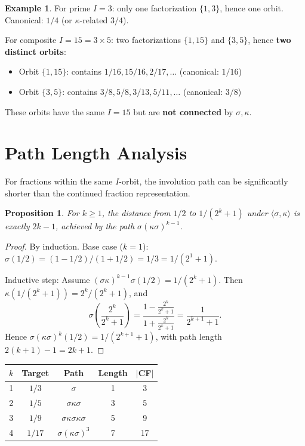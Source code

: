 \documentclass[11pt]{article}
\theoremstyle{plain}
\newtheorem{proposition}[theorem]{Proposition}
\theoremstyle{definition}
\newtheorem{example}[theorem]{Example}
\theoremstyle{remark}
\begin{document}
\begin{example}
For prime $I = 3$: only one factorization $\{1, 3\}$, hence one orbit.
Canonical: $1/4$ (or $\kappa$-related $3/4$).

For composite $I = 15 = 3 \times 5$: two factorizations $\{1, 15\}$ and $\{3, 5\}$,
hence \textbf{two distinct orbits}:
\begin{itemize}
\item Orbit $\{1, 15\}$: contains $1/16, 15/16, 2/17, \ldots$ (canonical: $1/16$)
\item Orbit $\{3, 5\}$: contains $3/8, 5/8, 3/13, 5/11, \ldots$ (canonical: $3/8$)
\end{itemize}
These orbits have the same $I = 15$ but are \textbf{not connected} by $\sigma, \kappa$.
\end{example}

\section{Path Length Analysis}

For fractions within the same $I$-orbit, the involution path can be significantly
shorter than the continued fraction representation.

\begin{proposition}
For $k \geq 1$, the distance from $1/2$ to $1/(2^k+1)$ under $\langle \sigma, \kappa \rangle$
is exactly $2k-1$, achieved by the path $\sigma(\kappa\sigma)^{k-1}$.
\end{proposition}

\begin{proof}
By induction. Base case ($k=1$): $\sigma(1/2) = (1-1/2)/(1+1/2) = 1/3 = 1/(2^1+1)$.

Inductive step: Assume $(\sigma\kappa)^{k-1}\sigma(1/2) = 1/(2^k+1)$.
Then $\kappa(1/(2^k+1)) = 2^k/(2^k+1)$, and
\[
\sigma\left(\frac{2^k}{2^k+1}\right) = \frac{1 - \frac{2^k}{2^k+1}}{1 + \frac{2^k}{2^k+1}}
= \frac{1}{2^{k+1}+1}.
\]
Hence $\sigma(\kappa\sigma)^k(1/2) = 1/(2^{k+1}+1)$, with path length $2(k+1)-1 = 2k+1$.
\end{proof}

\begin{center}
\begin{tabular}{ccccc}
\toprule
$k$ & Target & Path & Length & $|$CF$|$ \\
\midrule
1 & $1/3$ & $\sigma$ & 1 & 3 \\
2 & $1/5$ & $\sigma\kappa\sigma$ & 3 & 5 \\
3 & $1/9$ & $\sigma\kappa\sigma\kappa\sigma$ & 5 & 9 \\
4 & $1/17$ & $\sigma(\kappa\sigma)^3$ & 7 & 17 \\
\bottomrule
\end{tabular}
\end{center}
\end{document}
